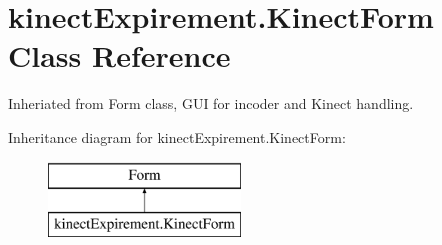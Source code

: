 \hypertarget{classkinect_expirement_1_1_kinect_form}{}\section{kinect\+Expirement.\+Kinect\+Form Class Reference}
\label{classkinect_expirement_1_1_kinect_form}


Inheriated from Form class, G\+UI for incoder and Kinect handling.  


Inheritance diagram for kinect\+Expirement.\+Kinect\+Form\+:\begin{figure}[H]
\begin{center}
\leavevmode
\includegraphics[height=2.000000cm]{classkinect_expirement_1_1_kinect_form}
\end{center}
\end{figure}

